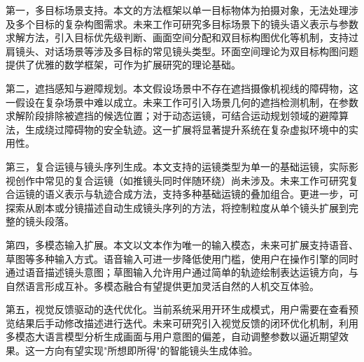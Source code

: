 第一，多目标场景支持。本文的方法框架以单一目标物体为拍摄对象，无法处理涉及多个目标的复杂构图需求。未来工作可研究多目标场景下的镜头语义表示与参数求解方法，引入目标优先级判断、画面空间分配和双目标构图优化等机制，支持过肩镜头、对话场景等涉及多目标的常见镜头类型。环面空间理论为双目标构图问题提供了优雅的数学框架，可作为扩展研究的理论基础。

第二，遮挡感知与避障规划。本文假设场景中不存在遮挡摄像机视线的障碍物，这一假设在复杂场景中难以成立。未来工作可引入场景几何的遮挡检测机制，在参数求解阶段排除被遮挡的候选位置；对于动态运镜，可结合运动规划领域的避障算法，生成绕过障碍物的安全轨迹。这一扩展将显著提升系统在复杂虚拟环境中的实用性。

第三，复合运镜与镜头序列生成。本文支持的运镜类型为单一的基础运镜，实际影视创作中常见的复合运镜（如推镜头同时伴随环绕）尚未涉及。未来工作可研究复合运镜的语义表示与轨迹合成方法，支持多种基础运镜的叠加组合。更进一步，可探索从剧本或分镜描述自动生成镜头序列的方法，将控制粒度从单个镜头扩展到完整的镜头段落。

第四，多模态输入扩展。本文以文本作为唯一的输入模态，未来可扩展支持语音、草图等多种输入方式。语音输入可进一步降低使用门槛，使用户在操作引擎的同时通过语音描述镜头意图；草图输入允许用户通过简单的轨迹绘制表达运镜方向，与自然语言形成互补。多模态融合有望提供更加灵活自然的人机交互体验。

第五，视觉反馈驱动的迭代优化。当前系统采用开环生成模式，用户需要在查看预览结果后手动修改描述进行迭代。未来可研究引入视觉反馈的闭环优化机制，利用多模态大语言模型分析生成画面与用户意图的偏差，自动调整参数以逼近期望效果。这一方向有望实现"所想即所得"的智能镜头生成体验。
